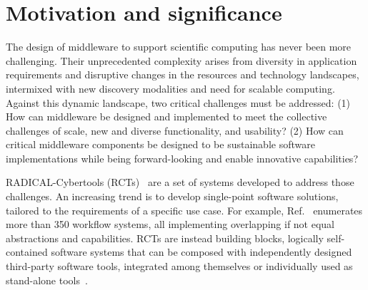 \documentclass[preprint,12pt, a4paper]{elsarticle}
\begin{document}
\section{Motivation and significance}\label{sec:motivation}


The design of middleware to support scientific computing has never been more challenging. Their unprecedented complexity arises from diversity in application requirements and disruptive changes in the resources and technology landscapes, intermixed with new discovery modalities and need for scalable computing. Against this dynamic landscape, two critical challenges must be addressed: (1) How can middleware be designed and implemented to meet the collective challenges of scale, new and diverse functionality, and usability? (2) How can critical middleware components be designed to be sustainable software implementations while being forward-looking and enable innovative capabilities?

RADICAL-Cybertools (RCTs)~\cite{github-rct} are a set of systems developed to address those challenges. An increasing trend is to develop single-point software solutions, tailored to the requirements of a specific use case. For example, Ref.~\cite{workflow-systems-url} enumerates more than 350 workflow systems, all implementing overlapping if not equal abstractions and capabilities. RCTs are instead building blocks, logically self-contained software systems that can be composed with independently designed third-party software tools, integrated among themselves or individually used as stand-alone tools~\cite{turilli2019middleware}.
\end{document}
